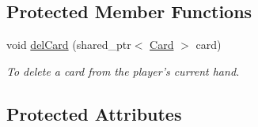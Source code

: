 \subsection*{\-Protected \-Member \-Functions}
\begin{DoxyCompactItemize}
\item 
void \hyperlink{classPlayer_a82c40ddca5214bbc9cc204ae9b789ca7}{del\-Card} (shared\-\_\-ptr$<$ \hyperlink{classCard}{\-Card} $>$ card)
\begin{DoxyCompactList}\small\item\em \-To delete a card from the player's current hand. \end{DoxyCompactList}\end{DoxyCompactItemize}
\subsection*{\-Protected \-Attributes}
